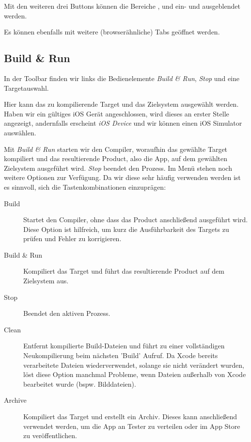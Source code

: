 \documentclass[parskip=half, final]{scrreprt}
\begin{document}
Mit den weiteren drei Buttons können die Bereiche ,  und  ein- und ausgeblendet werden.

Es können ebenfalls mit  weitere (browserähnliche) Tabs geöffnet werden.

\subsection{Build \& Run}\label{sec:buildandrun}

In der Toolbar finden wir links die Bedienelemente \emph{Build \& Run}, \emph{Stop} und eine Targetauswahl.

Hier kann das zu kompilierende Target und das Zielsystem ausgewählt werden. Haben wir ein gültiges iOS Gerät angeschlossen, wird dieses an erster Stelle angezeigt, andernfalls erscheint \emph{iOS Device} und wir können einen iOS Simulator auswählen.

Mit \emph{Build \& Run} starten wir den Compiler, woraufhin das gewählte Target kompiliert und das resultierende Product, also die App, auf dem gewählten Zielsystem ausgeführt wird. \emph{Stop} beendet den Prozess. Im Menü  stehen noch weitere Optionen zur Verfügung. Da wir diese sehr häufig verwenden werden ist es sinnvoll, sich die Tastenkombinationen einzuprägen:
\begin{description}
\item[Build]  Startet den Compiler, ohne dass das Product anschließend ausgeführt wird. Diese Option ist hilfreich, um kurz die Ausführbarkeit des Targets zu prüfen und Fehler zu korrigieren.
\item[Build \& Run]  Kompiliert das Target und führt das resultierende Product auf dem Zielsystem aus.
\item[Stop]  Beendet den aktiven Prozess.
\item[Clean]  Entfernt kompilierte Build-Dateien und führt zu einer vollständigen Neukompilierung beim nächsten 'Build' Aufruf. Da Xcode bereits verarbeitete Dateien wiederverwendet, solange sie nicht verändert wurden, löst diese Option manchmal Probleme, wenn Dateien außerhalb von Xcode bearbeitet wurde (bspw. Bilddateien).
\item[Archive] Kompiliert das Target und erstellt ein Archiv. Dieses kann anschließend verwendet werden, um die App an Tester zu verteilen oder im App Store zu veröffentlichen.
\end{description}
\end{document}
